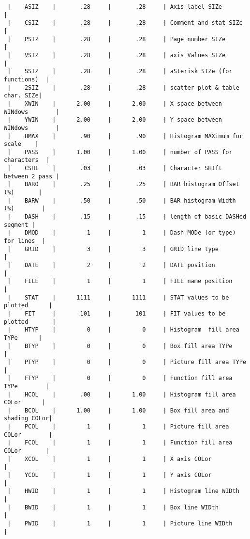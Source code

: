 \begin{verbatim}
 |    ASIZ    |       .28     |       .28     | Axis label SIZe                |
 |    CSIZ    |       .28     |       .28     | Comment and stat SIZe          |
 |    PSIZ    |       .28     |       .28     | Page number SIZe               |
 |    VSIZ    |       .28     |       .28     | axis Values SIZe               |
 |    SSIZ    |       .28     |       .28     | aSterisk SIZe (for functions)  |
 |    2SIZ    |       .28     |       .28     | scatter-plot & table char. SIZe|
 |    XWIN    |      2.00     |      2.00     | X space between WINdows        |
 |    YWIN    |      2.00     |      2.00     | Y space between WINdows        |
 |    HMAX    |       .90     |       .90     | Histogram MAXimum for scale    |
 |    PASS    |      1.00     |      1.00     | number of PASS for characters  |
 |    CSHI    |       .03     |       .03     | Character SHIft between 2 pass |
 |    BARO    |       .25     |       .25     | BAR histogram Offset (%)       |
 |    BARW    |       .50     |       .50     | BAR histogram Width (%)        |
 |    DASH    |       .15     |       .15     | length of basic DASHed segment |
 |    DMOD    |         1     |         1     | Dash MODe (or type) for lines  |
 |    GRID    |         3     |         3     | GRID line type                 |
 |    DATE    |         2     |         2     | DATE position                  |
 |    FILE    |         1     |         1     | FILE name position             |
 |    STAT    |      1111     |      1111     | STAT values to be plotted      |
 |    FIT     |       101     |       101     | FIT values to be plotted       |
 |    HTYP    |         0     |         0     | Histogram  fill area TYPe      |
 |    BTYP    |         0     |         0     | Box fill area TYPe             |
 |    PTYP    |         0     |         0     | Picture fill area TYPe         |
 |    FTYP    |         0     |         0     | Function fill area TYPe        |
 |    HCOL    |       .00     |      1.00     | Histogram fill area COLor      |
 |    BCOL    |      1.00     |      1.00     | Box fill area and shading COLor|
 |    PCOL    |         1     |         1     | Picture fill area COLor        |
 |    FCOL    |         1     |         1     | Function fill area COLor       |
 |    XCOL    |         1     |         1     | X axis COLor                   |
 |    YCOL    |         1     |         1     | Y axis COLor                   |
 |    HWID    |         1     |         1     | Histogram line WIDth           |
 |    BWID    |         1     |         1     | Box line WIDth                 |
 |    PWID    |         1     |         1     | Picture line WIDth             |

\end{verbatim}
